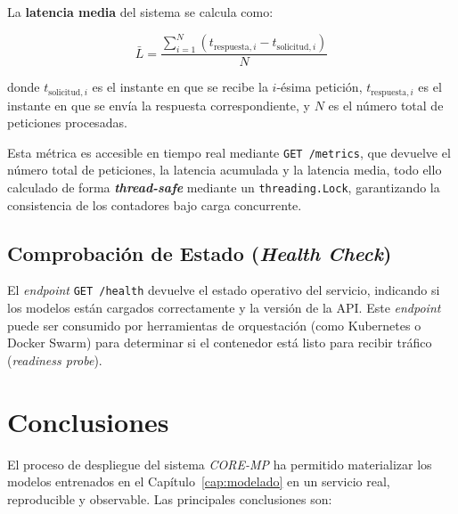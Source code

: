La \textbf{latencia media} del sistema se calcula como:

\begin{equation}
    \bar{L} = \frac{\displaystyle\sum_{i=1}^{N} \left( t_{\text{respuesta},i} - t_{\text{solicitud},i} \right)}{N}
    \label{eq:latencia_media}
\end{equation}

donde $t_{\text{solicitud},i}$ es el instante en que se recibe la $i$-ésima petición, $t_{\text{respuesta},i}$ es el instante en que se envía la respuesta correspondiente, y $N$ es el número total de peticiones procesadas.

Esta métrica es accesible en tiempo real mediante \texttt{GET /metrics}, que devuelve el número total de peticiones, la latencia acumulada y la latencia media, todo ello calculado de forma \textbf{\textit{thread-safe}} mediante un \texttt{threading.Lock}, garantizando la consistencia de los contadores bajo carga concurrente.

\subsection{Comprobación de Estado (\textit{Health Check})}
\label{subsec:health_check}

El \textit{endpoint} \texttt{GET /health} devuelve el estado operativo del servicio, indicando si los modelos están cargados correctamente y la versión de la API. Este \textit{endpoint} puede ser consumido por herramientas de orquestación (como Kubernetes o Docker Swarm) para determinar si el contenedor está listo para recibir tráfico (\textit{readiness probe}).

\section{Conclusiones}
\label{sec:conclusiones_despliegue}

El proceso de despliegue del sistema \textit{CORE-MP} ha permitido materializar los modelos entrenados en el Capítulo~\ref{cap:modelado} en un servicio real, reproducible y observable. Las principales conclusiones son:

